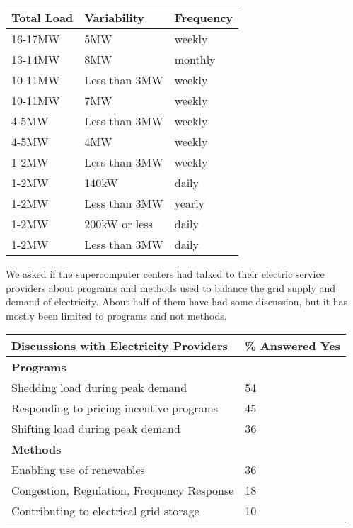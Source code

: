 \documentclass{llncs}
\begin{document}
\begin{table}[htbp]
\begin{center}
\begin{tabular}{|p{65pt}|l|l|}
\hline
\textbf{Total Load}&
\textbf{Variability}&
\textbf{Frequency} \\
\hline
16-17MW&
5MW&
weekly \\
\hline
13-14MW&
8MW&
monthly \\
\hline
10-11MW&
Less than 3MW&
weekly \\
\hline
10-11MW&
7MW&
weekly \\
\hline
4-5MW&
Less than 3MW&
weekly \\
\hline
4-5MW&
4MW&
weekly \\
\hline
1-2MW&
Less than 3MW&
weekly \\
\hline
1-2MW&
140kW&
daily \\
\hline
1-2MW&
Less than 3MW&
yearly \\
\hline
1-2MW&
200kW or less&
daily \\
\hline
1-2MW&
Less than 3MW&
daily \\
\hline
\end{tabular}
\label{tab1}
\end{center}
\end{table}

We asked if the supercomputer centers had talked to their electric service
providers about programs and methods used to balance the grid supply and
demand of electricity. About half of them have had some discussion, but it
has mostly been limited to programs and not methods.

\begin{table}[htbp]
\begin{center}
\begin{tabular}{|p{230pt}|l|}
\hline
\textbf{Discussions with Electricity Providers}&
{\%} Answered Yes \\
\hline
\textbf{Programs}&
~ \\
\hline
Shedding load during peak demand&
54 \\
\hline
Responding to pricing incentive programs&
45 \\
\hline
Shifting load during peak demand&
36 \\
\hline
\textbf{Methods}&
~ \\
\hline
Enabling use of renewables&
36 \\
\hline
Congestion, Regulation, Frequency Response&
18 \\
\hline
Contributing to electrical grid storage&
10 \\
\hline
\end{tabular}
\label{tab1}
\end{center}
\end{table}
\end{document}
